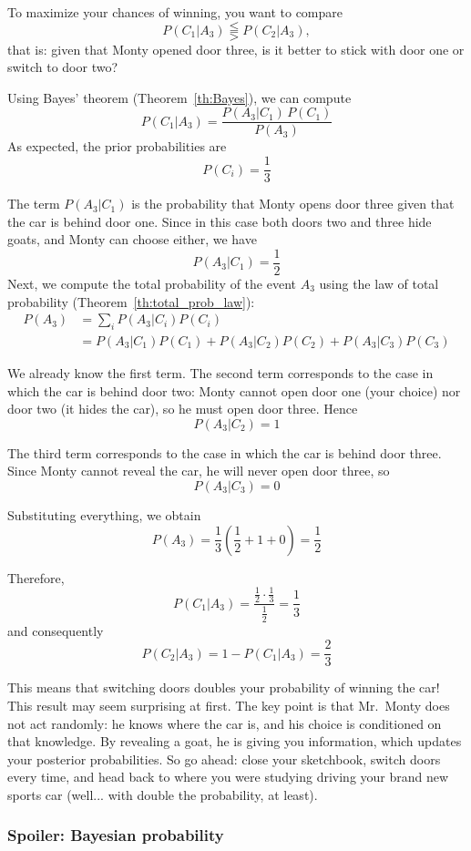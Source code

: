\begin{example}
	To maximize your chances of winning, you want to compare
	\[
	P(C_1|A_3)\lesseqqgtr P(C_2|A_3),
	\]
	that is: given that Monty opened door three, is it better to stick with door one or switch to door two?
	
	Using Bayes' theorem (Theorem~\ref{th:Bayes}), we can compute
	\[
	P(C_1|A_3)=\frac{P(A_3|C_1)\,P(C_1)}{P(A_3)}
	\]
	As expected, the prior probabilities are
	\[
	P(C_i)=\frac{1}{3}
	\]
	
	The term $P(A_3|C_1)$ is the probability that Monty opens door three given that the car is behind door one. Since in this case both doors two and three hide goats, and Monty can choose either, we have
	\[
	P(A_3|C_1)=\frac{1}{2}
	\]
	Next, we compute the total probability of the event $A_3$ using the law of total probability (Theorem~\ref{th:total_prob_law}):
	\begin{align*}
		P(A_3)
		&=\sum_i P(A_3|C_i)P(C_i)\\
		&=P(A_3|C_1)P(C_1)+P(A_3|C_2)P(C_2)+P(A_3|C_3)P(C_3)
	\end{align*}
	
	We already know the first term. The second term corresponds to the case in which the car is behind door two: Monty cannot open door one (your choice) nor door two (it hides the car), so he must open door three. Hence
	\[
	P(A_3|C_2)=1
	\]
	
	The third term corresponds to the case in which the car is behind door three. Since Monty cannot reveal the car, he will never open door three, so
	\[
	P(A_3|C_3)=0
	\]
	
	Substituting everything, we obtain
	\[
	P(A_3)=\frac{1}{3}\left(\frac{1}{2}+1+0\right)=\frac{1}{2}
	\]
	
	Therefore,
	\[
	P(C_1|A_3)=\frac{\frac{1}{2}\cdot\frac{1}{3}}{\frac{1}{2}}=\frac{1}{3}
	\]
	and consequently
	\[
	P(C_2|A_3)=1-P(C_1|A_3)=\frac{2}{3}
	\]
	
	This means that switching doors doubles your probability of winning the car!
	This result may seem surprising at first. The key point is that Mr.~Monty does not act randomly: he knows where the car is, and his choice is conditioned on that knowledge. By revealing a goat, he is giving you information, which updates your posterior probabilities.
	So go ahead: close your sketchbook, switch doors every time, and head back to where you were studying driving your brand new sports car (well... with double the probability, at least).
\end{example}


\subsubsection{Spoiler: Bayesian probability}
\label{subsubsec:Bayes}

